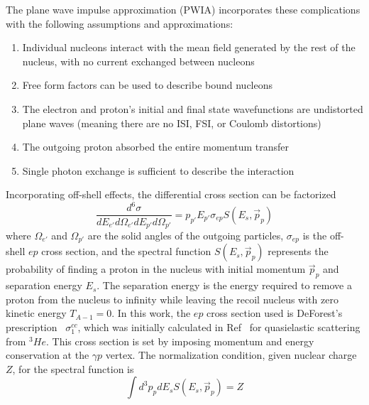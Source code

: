 The plane wave impulse approximation (PWIA) incorporates these complications
with the following assumptions and approximations:
\begin{enumerate}
    \item Individual nucleons interact with the mean field generated by the rest
        of the nucleus, with no current exchanged between nucleons
    \item Free form factors can be used to describe bound nucleons
    \item The electron and proton's initial and final state wavefunctions are
        undistorted plane waves (meaning there are no ISI, FSI, or Coulomb
        distortions)
    \item The outgoing proton absorbed the entire momentum transfer
    \item Single photon exchange is sufficient to describe the interaction
\end{enumerate}

Incorporating off-shell effects, the differential cross section can be
factorized~\cite{Dieperink_1975, DeForest_1983, Frullani_1984}
\begin{equation} \label{eqn:born_cross_section}
    \frac{d^6 \sigma}{dE_{e'} d\Omega_{e'} dE_{p'} d\Omega_{p'}} = p_{p'} E_{p'} \sigma_{ep} S(E_s, \vec{p}_p)
\end{equation}
where $\Omega_{e'}$ and $\Omega_{p'}$ are the solid angles of the outgoing particles,
$\sigma_{ep}$ is the off-shell $ep$ cross section,
and the spectral function $S(E_s, \vec{p}_p)$ represents the probability of
finding a proton in the nucleus with initial momentum $\vec{p}_p$ and
separation energy $E_s$.
The separation energy is the energy required to remove a proton from the nucleus
to infinity while leaving the recoil nucleus with zero kinetic energy
$T_{A-1}=0$.
In this work, the $ep$ cross section used is DeForest's
prescription~\cite{DeForest_1983} $\sigma^{cc}_1$,
which was initially calculated in Ref~\cite{Dieperink_1976} for quasielastic
scattering from ${}^3He$.
This cross section is set by imposing momentum and energy conservation at the
$\gamma p$ vertex.
The normalization condition, given nuclear charge $Z$, for the spectral
function is
\begin{equation}
\int d^3p_p dE_s S(E_s, \vec{p}_p) = Z
\end{equation}

